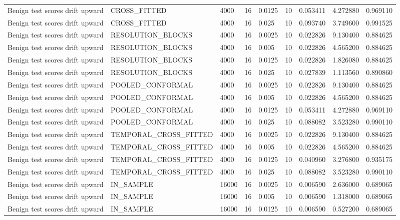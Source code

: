 \begin{tabular}{lllllllll}
Benign test scores drift upward & CROSS\_FITTED & 4000 & 16 & 0.0125 & 10 & 0.053411 & 4.272880 & 0.969110 \\
Benign test scores drift upward & CROSS\_FITTED & 4000 & 16 & 0.025 & 10 & 0.093740 & 3.749600 & 0.991525 \\
Benign test scores drift upward & RESOLUTION\_BLOCKS & 4000 & 16 & 0.0025 & 10 & 0.022826 & 9.130400 & 0.884625 \\
Benign test scores drift upward & RESOLUTION\_BLOCKS & 4000 & 16 & 0.005 & 10 & 0.022826 & 4.565200 & 0.884625 \\
Benign test scores drift upward & RESOLUTION\_BLOCKS & 4000 & 16 & 0.0125 & 10 & 0.022826 & 1.826080 & 0.884625 \\
Benign test scores drift upward & RESOLUTION\_BLOCKS & 4000 & 16 & 0.025 & 10 & 0.027839 & 1.113560 & 0.890860 \\
Benign test scores drift upward & POOLED\_CONFORMAL & 4000 & 16 & 0.0025 & 10 & 0.022826 & 9.130400 & 0.884625 \\
Benign test scores drift upward & POOLED\_CONFORMAL & 4000 & 16 & 0.005 & 10 & 0.022826 & 4.565200 & 0.884625 \\
Benign test scores drift upward & POOLED\_CONFORMAL & 4000 & 16 & 0.0125 & 10 & 0.053411 & 4.272880 & 0.969110 \\
Benign test scores drift upward & POOLED\_CONFORMAL & 4000 & 16 & 0.025 & 10 & 0.088082 & 3.523280 & 0.990110 \\
Benign test scores drift upward & TEMPORAL\_CROSS\_FITTED & 4000 & 16 & 0.0025 & 10 & 0.022826 & 9.130400 & 0.884625 \\
Benign test scores drift upward & TEMPORAL\_CROSS\_FITTED & 4000 & 16 & 0.005 & 10 & 0.022826 & 4.565200 & 0.884625 \\
Benign test scores drift upward & TEMPORAL\_CROSS\_FITTED & 4000 & 16 & 0.0125 & 10 & 0.040960 & 3.276800 & 0.935175 \\
Benign test scores drift upward & TEMPORAL\_CROSS\_FITTED & 4000 & 16 & 0.025 & 10 & 0.088082 & 3.523280 & 0.990110 \\
Benign test scores drift upward & IN\_SAMPLE & 16000 & 16 & 0.0025 & 10 & 0.006590 & 2.636000 & 0.689065 \\
Benign test scores drift upward & IN\_SAMPLE & 16000 & 16 & 0.005 & 10 & 0.006590 & 1.318000 & 0.689065 \\
Benign test scores drift upward & IN\_SAMPLE & 16000 & 16 & 0.0125 & 10 & 0.006590 & 0.527200 & 0.689065 \\

\end{tabular}
